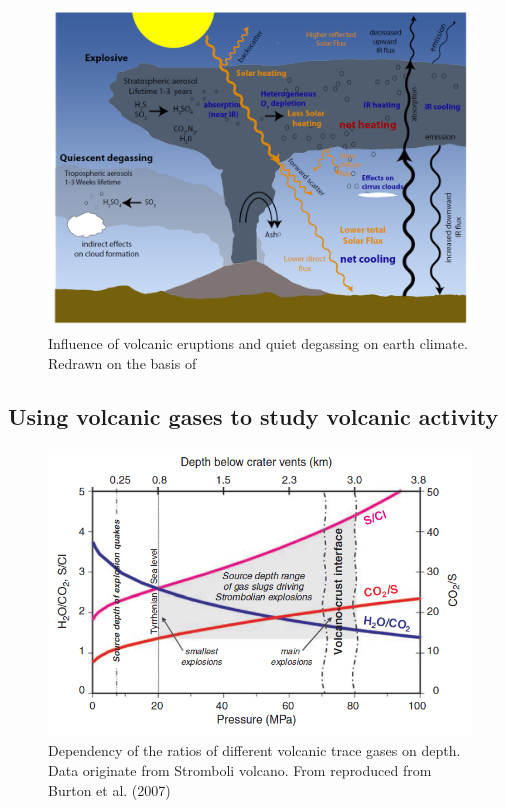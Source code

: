 \documentclass  [
  paper    = a4,
  BCOR     = 10mm,
  twoside,
  fontsize = 12pt,
  fleqn,
  toc      = bibnumbered,
  toc      = listofnumbered,
  numbers  = noendperiod,
  headings = normal,
  listof   = leveldown,
  version  = 3.03
]                                       {scrreprt}
\begin{document}
\begin{figure}
	\centering
	\includegraphics[width=0.7\linewidth]{Bilder/Simon/Bilder_Tung/Climate_Influence}
	\caption{Influence of volcanic eruptions and quiet degassing on earth climate. Redrawn on the basis of \cite{robock2000volcanic}}
	\label{fig:climateinfluence}
\end{figure}










\subsection{Using volcanic gases to study volcanic activity}
\begin{figure}
	\centering
	\includegraphics[width=0.7\linewidth]{Zwischenbericht2018/Bilder/so2_bro}
	\caption{Dependency of the ratios of different volcanic trace gases on depth. Data originate from Stromboli volcano. From \cite{lubcke2014optical} reproduced from Burton et al. (2007)}
	\label{fig:so2bro}
\end{figure}    
	
	
	
	
	
\end{document}
